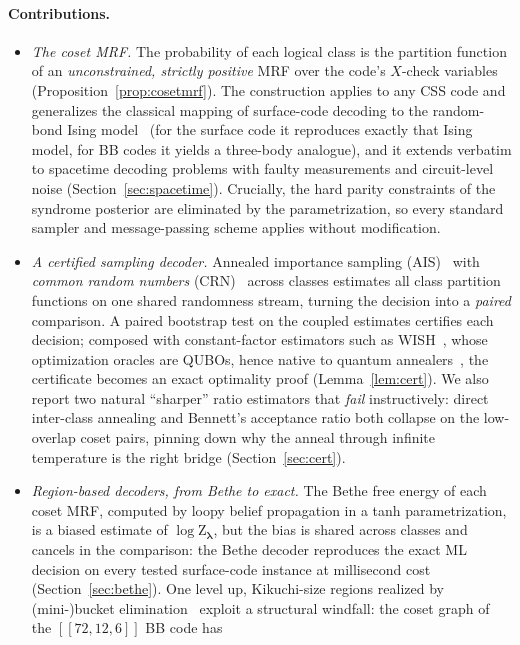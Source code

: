 \documentclass[a4paper,11pt]{quantumarticle}
\theoremstyle{definition}
\newcommand{\vlam}{\boldsymbol{\lambda}}
\newcommand{\Z}{\mathrm{Z}}
\begin{document}
\paragraph{Contributions.}
\begin{itemize}
\item \emph{The coset MRF.} The probability of each logical class is the
partition function of an \emph{unconstrained, strictly positive} MRF over
the code's $X$-check variables (Proposition~\ref{prop:cosetmrf}). The
construction applies to any CSS code and generalizes the classical mapping
of surface-code decoding to the random-bond Ising
model~\cite{dennis2002} (for the surface code it reproduces exactly that
Ising model, for BB codes it yields a three-body analogue), and it extends
verbatim to spacetime decoding problems with faulty measurements and
circuit-level noise (Section~\ref{sec:spacetime}). Crucially, the hard
parity constraints of the syndrome posterior are eliminated by the
parametrization, so every standard sampler and message-passing scheme
applies without modification.
\item \emph{A certified sampling decoder.} Annealed importance sampling
(AIS)~\cite{neal2001} with \emph{common random numbers}
(CRN)~\cite{robert2004} across classes estimates all class partition
functions on one shared randomness stream, turning the decision into a
\emph{paired} comparison. A paired bootstrap test on the coupled estimates
certifies each decision; composed with constant-factor estimators such as
WISH~\cite{ermon2013}, whose optimization oracles are QUBOs, hence native
to quantum annealers~\cite{kadowaki1998}, the certificate becomes an exact
optimality proof (Lemma~\ref{lem:cert}). We also report two natural
``sharper'' ratio estimators that \emph{fail} instructively: direct
inter-class annealing and Bennett's acceptance ratio both collapse on the
low-overlap coset pairs, pinning down why the anneal through infinite
temperature is the right bridge (Section~\ref{sec:cert}).
\item \emph{Region-based decoders, from Bethe to exact.} The Bethe free
energy of each coset MRF, computed by loopy belief propagation in a tanh
parametrization, is a biased estimate of $\log\Z_{\vlam}$, but the bias
is shared across classes and cancels in the comparison: the Bethe decoder
reproduces the exact ML decision on every tested surface-code instance at
millisecond cost (Section~\ref{sec:bethe}). One level up, Kikuchi-size
regions realized by (mini-)bucket elimination~\cite{dechter2003} exploit a
structural windfall: the coset graph of the $[\![72,12,6]\!]$ BB code has

\end{itemize}
\end{document}
